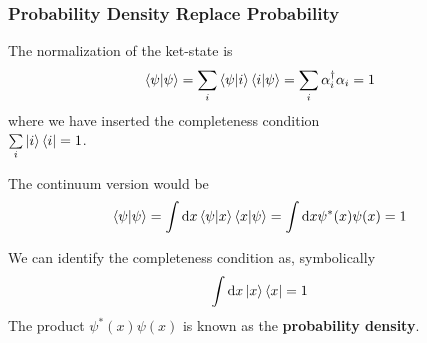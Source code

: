 \subsubsection{Probability Density Replace Probability}
The normalization of the ket-state is
\begin{align*}
    \braket{\psi|\psi}=\sum_i\braket{\psi|i}\braket{i|\psi}=\sum_i\alpha_i^\dagger\alpha_i=1
\end{align*}
where we have inserted the completeness condition\\ $\sum\limits_i\ket{i}\bra{i}=1$. 

The continuum version would be 
\begin{align*}
    \braket{\psi|\psi}=\int \mathrm{d}x\braket{\psi|x}\braket{x|\psi}=\int \mathrm{d}x\psi^*(x)\psi(x)=1
\end{align*}

We can identify the completeness condition as, symbolically
\begin{align*}
    \int\mathrm{d}x\ket{x}\bra{x}=1
\end{align*}
The product $\psi^*(x)\psi(x)$ is known as the \textbf{probability density}. 